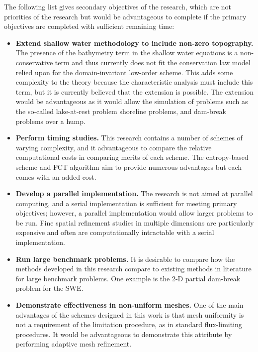 The following list gives secondary objectives of the research, which are
not priorities of the research but would be advantageous to complete
if the primary objectives are completed with sufficient remaining time:

\begin{itemize}
  \item \textbf{Extend shallow water methodology to include non-zero topography.}
    The presence of the bathymetry term in the shallow water equations
    is a non-conservative term and thus currently does not fit the conservation
    law model relied upon for the domain-invariant low-order scheme.
    This adds some complexity to the theory because the characteristic
    analysis must include this term, but it is currently believed that the
    extension is possible. The extension would be advantageous as it would
    allow the simulation of problems such as the so-called lake-at-rest problem
    shoreline problems, and dam-break problems over a hump.
  \item \textbf{Perform timing studies.}
    This research contains a number of schemes of varying complexity, and
    it advantageous to compare the relative computational costs in
    comparing merits of each scheme. The entropy-based scheme and FCT
    algorithm aim to provide numerous advantages but each comes with
    an added cost.
  \item \textbf{Develop a parallel implementation.}
    The research is not aimed at parallel computing, and a serial
    implementation is sufficient for meeting primary objectives;
    however, a parallel implementation would allow larger problems
    to be run. Fine spatial refinement studies in multiple dimensions
    are particularly expensive and often are computationally intractable
    with a serial implementation.
  \item \textbf{Run large benchmark problems.}
    It is desirable to compare how the methods developed in this research
    compare to existing methods in literature for large benchmark
    problems. One example is the 2-D partial dam-break problem for the SWE.
  \item \textbf{Demonstrate effectiveness in non-uniform meshes.}
    One of the main advantages of the schemes designed in this work is
    that mesh uniformity is not a requirement of the limitation procedure,
    as in standard flux-limiting procedures. It would be advantageous
    to demonstrate this attribute by performing adaptive mesh refinement.
\end{itemize}

